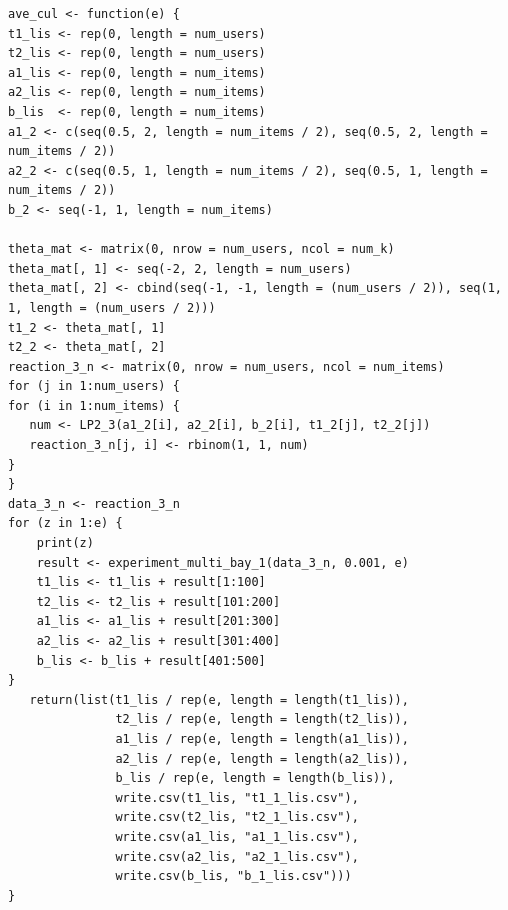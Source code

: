\documentclass[12pt]{jarticle}
\numberwithin{equation}{subsection}
\begin{document}
\begin{lstlisting}[caption=ベイズ推定法(多次元),label=fuge]
ave_cul <- function(e) {
t1_lis <- rep(0, length = num_users)
t2_lis <- rep(0, length = num_users)
a1_lis <- rep(0, length = num_items)
a2_lis <- rep(0, length = num_items)
b_lis  <- rep(0, length = num_items)
a1_2 <- c(seq(0.5, 2, length = num_items / 2), seq(0.5, 2, length = num_items / 2))
a2_2 <- c(seq(0.5, 1, length = num_items / 2), seq(0.5, 1, length = num_items / 2))
b_2 <- seq(-1, 1, length = num_items)

theta_mat <- matrix(0, nrow = num_users, ncol = num_k)
theta_mat[, 1] <- seq(-2, 2, length = num_users)
theta_mat[, 2] <- cbind(seq(-1, -1, length = (num_users / 2)), seq(1, 1, length = (num_users / 2)))
t1_2 <- theta_mat[, 1]
t2_2 <- theta_mat[, 2]
reaction_3_n <- matrix(0, nrow = num_users, ncol = num_items)
for (j in 1:num_users) {
for (i in 1:num_items) {
   num <- LP2_3(a1_2[i], a2_2[i], b_2[i], t1_2[j], t2_2[j])
   reaction_3_n[j, i] <- rbinom(1, 1, num)
}
}
data_3_n <- reaction_3_n
for (z in 1:e) {
    print(z)
    result <- experiment_multi_bay_1(data_3_n, 0.001, e)
    t1_lis <- t1_lis + result[1:100]
    t2_lis <- t2_lis + result[101:200]
    a1_lis <- a1_lis + result[201:300]
    a2_lis <- a2_lis + result[301:400]
    b_lis <- b_lis + result[401:500]
}
   return(list(t1_lis / rep(e, length = length(t1_lis)),
               t2_lis / rep(e, length = length(t2_lis)),
               a1_lis / rep(e, length = length(a1_lis)),
               a2_lis / rep(e, length = length(a2_lis)),
               b_lis / rep(e, length = length(b_lis)),
               write.csv(t1_lis, "t1_1_lis.csv"),
               write.csv(t2_lis, "t2_1_lis.csv"),
               write.csv(a1_lis, "a1_1_lis.csv"),
               write.csv(a2_lis, "a2_1_lis.csv"),
               write.csv(b_lis, "b_1_lis.csv")))
}
\end{lstlisting}
\end{document}

